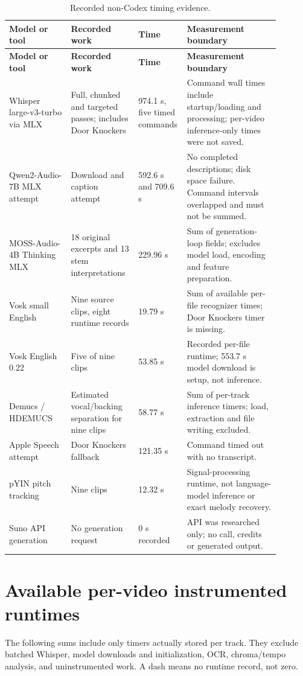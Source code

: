 \documentclass[10pt]{article}
\begin{document}
\footnotesize\begin{longtable}{p{0.22\linewidth}p{0.24\linewidth}p{0.10\linewidth}p{0.33\linewidth}}
\caption{Recorded non-Codex timing evidence.}\\
\toprule\textbf{Model or tool} & \textbf{Recorded work} & \textbf{Time} & \textbf{Measurement boundary}\\
\midrule\endfirsthead
\toprule\textbf{Model or tool} & \textbf{Recorded work} & \textbf{Time} & \textbf{Measurement boundary}\\
\midrule\endhead
Whisper large-v3-turbo via MLX & Full, chunked and targeted passes; includes Door Knockers & 974.1 s, five timed commands & Command wall times include startup/loading and processing; per-video inference-only times were not saved.\\
Qwen2-Audio-7B MLX attempt & Download and caption attempt & 592.6 s and 709.6 s & No completed descriptions; disk space failure. Command intervals overlapped and must not be summed.\\
MOSS-Audio-4B Thinking MLX & 18 original excerpts and 13 stem interpretations & 229.96 s & Sum of generation-loop fields; excludes model load, encoding and feature preparation.\\
Vosk small English & Nine source clips, eight runtime records & 19.79 s & Sum of available per-file recognizer times; Door Knockers timer is missing.\\
Vosk English 0.22 & Five of nine clips & 53.85 s & Recorded per-file runtime; 553.7 s model download is setup, not inference.\\
Demucs / HDEMUCS & Estimated vocal/backing separation for nine clips & 58.77 s & Sum of per-track inference timers; load, extraction and file writing excluded.\\
Apple Speech attempt & Door Knockers fallback & 121.35 s & Command timed out with no transcript.\\
pYIN pitch tracking & Nine clips & 12.32 s & Signal-processing runtime, not language-model inference or exact melody recovery.\\
Suno API generation & No generation request & 0 s recorded & API was researched only; no call, credits or generated output.\\
\bottomrule
\end{longtable}

\section{Available per-video instrumented runtimes}
The following sums include only timers actually stored per track. They exclude batched Whisper, model downloads and initialization, OCR, chroma/tempo analysis, and uninstrumented work. A dash means no runtime record, not zero.
\end{document}
